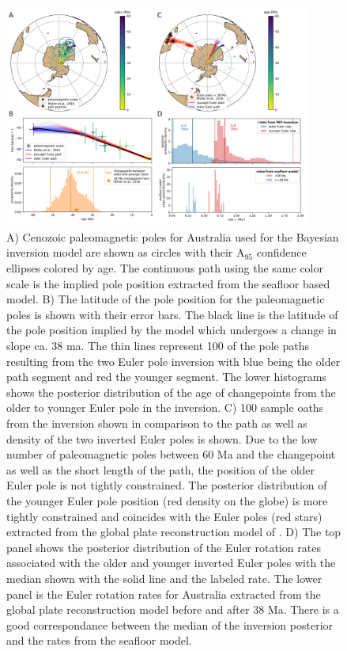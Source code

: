 \documentclass[11pt,letterpaper]{article}
\begin{document}
\begin{figure}
\includegraphics[width=0.9\textwidth]{fig_aus_inversion.png}
\caption{A) Cenozoic paleomagnetic poles for Australia used for the Bayesian inversion model are shown as circles with their A$_{95}$ confidence ellipses colored by age. The continuous path using the same color scale is the implied pole position extracted from the \cite{Muller2016a} seafloor based model. B) The latitude of the pole position for the paleomagnetic poles is shown with their error bars. The black line is the latitude of the pole position implied by the \cite{Muller2016a} model which undergoes a change in slope ca. 38 ma. The thin lines represent 100 of the pole paths resulting from the two Euler pole inversion with blue being the older path segment and red the younger segment. The lower histograms shows the posterior distribution of the age of changepoints from the older to younger Euler pole in the inversion.  C) 100 sample oaths from the inversion shown in comparison to the \cite{Muller2016a} path as well as density of the two inverted Euler poles is shown. Due to the low number of paleomagnetic poles between 60 Ma and the changepoint as well as the short length of the path, the position of the older Euler pole is not tightly constrained. The posterior distribution of the younger Euler pole position (red density on the globe) is more tightly constrained and coincides with the Euler poles (red stars) extracted from the global plate reconstruction model of \cite{Muller2016a}. D) The top panel shows the posterior distribution of the Euler rotation rates associated with the older and younger inverted Euler poles with the median shown with the solid line and the labeled rate. The lower panel is the Euler rotation rates for Australia extracted from the global plate reconstruction model before and after 38 Ma. There is a good correspondance between the median of the inversion posterior and the rates from the seafloor model.}
\label{fig:Aus_Cenozoic_track}
\end{figure}
\end{document}
